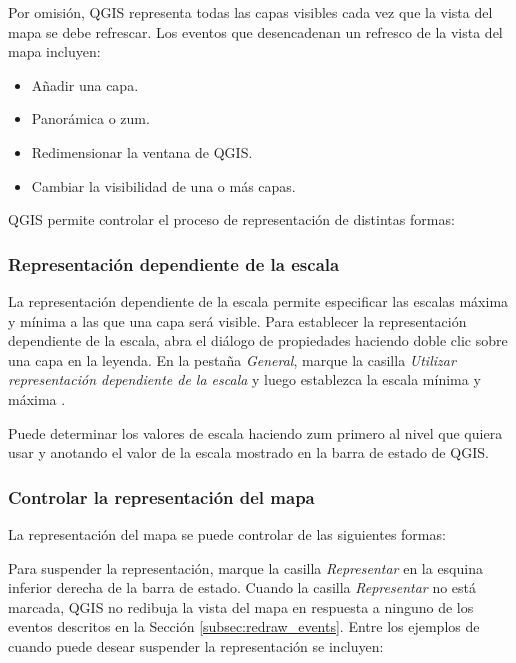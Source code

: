 Por omisión, QGIS representa todas las capas visibles cada vez que la vista del mapa se debe refrescar. Los eventos 
que desencadenan un refresco de la vista del mapa incluyen:

\begin{itemize}
\item Añadir una capa.
\item Panorámica o zum.
\item Redimensionar la ventana de QGIS.
\item Cambiar la visibilidad de una o más capas.
\end{itemize}

QGIS permite controlar el proceso de representación de distintas formas:

\subsubsection{Representación dependiente de la escala}
\label{label_scaledepend}

La representación dependiente de la escala permite especificar las escalas máxima y mínima a las que una capa será 
visible. Para establecer la representación dependiente de la escala, abra el diálogo de propiedades haciendo 
doble clic sobre una capa en la leyenda. En la pestaña \textit{General}, marque la casilla  \textit{Utilizar 
representación dependiente de la escala} y luego establezca la escala mínima y máxima .

Puede determinar los valores de escala haciendo zum primero al nivel que quiera usar y anotando el valor de la 
escala mostrado en la barra de estado de QGIS.

\subsubsection{Controlar la representación del mapa}\label{label_controlmap}

La representación del mapa se puede controlar de las siguientes formas:

\label{label_suspendrender}

Para suspender la representación, marque la casilla \textit{Representar} en la esquina inferior derecha de la 
barra de estado. Cuando la casilla \textit{Representar} no está marcada, QGIS no redibuja la vista del mapa en 
respuesta a ninguno de los eventos descritos en la Sección
\ref{subsec:redraw_events}. Entre los ejemplos de cuando puede desear suspender la representación se incluyen:

